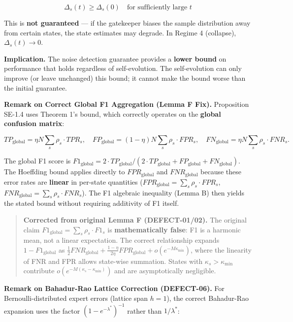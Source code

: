\documentclass[
  12pt,
]{article}
\begin{document}
\[
\Delta_s(t) \geq \Delta_s(0) \quad \text{for sufficiently large } t
\]

This is \textbf{not guaranteed} --- if the gatekeeper biases the sample
distribution away from certain states, the state estimates may degrade.
In Regime 4 (collapse), \(\Delta_s(t) \to 0\).

\textbf{Implication.} The noise detection guarantee provides a
\textbf{lower bound} on performance that holds regardless of
self-evolution. The self-evolution can only improve (or leave unchanged)
this bound; it cannot make the bound worse than the initial guarantee.

\textbf{Remark on Correct Global F1 Aggregation (Lemma F Fix).}
Proposition SE-1.4 uses Theorem 1's bound, which correctly operates on
the \textbf{global confusion matrix}:

\[TP_{\text{global}} = \eta N \sum_s \rho_s \cdot TPR_s,\quad
FP_{\text{global}} = (1-\eta)N \sum_s \rho_s \cdot FPR_s,\quad
FN_{\text{global}} = \eta N \sum_s \rho_s \cdot FNR_s.\]

The global F1 score is
\(F1_{\text{global}} = 2 \cdot TP_{\text{global}} / (2 \cdot TP_{\text{global}} + FP_{\text{global}} + FN_{\text{global}})\).
The Hoeffding bound applies directly to \(FPR_{\text{global}}\) and
\(FNR_{\text{global}}\) because these error rates are \textbf{linear} in
per-state quantities
(\(FPR_{\text{global}} = \sum_s \rho_s \cdot FPR_s\),
\(FNR_{\text{global}} = \sum_s \rho_s \cdot FNR_s\)). The F1 algebraic
inequality (Lemma B) then yields the stated bound without requiring
additivity of F1 itself.

\begin{quote}
\textbf{Corrected from original Lemma F (DEFECT-01/02).} The original
claim \(F1_{\text{global}} = \sum_s \rho_s \cdot F1_s\) is
\textbf{mathematically false}: F1 is a harmonic mean, not a linear
expectation. The correct relationship expands \(1 - F1_{\text{global}}\)
as
\(\frac{1}{2}FNR_{\text{global}} + \frac{1-\eta}{2\eta}FPR_{\text{global}} + o(e^{-M\kappa_{\min}})\),
where the linearity of FNR and FPR allows state-wise summation. States
with \(\kappa_s > \kappa_{\min}\) contribute
\(o(e^{-M(\kappa_s-\kappa_{\min})})\) and are asymptotically negligible.
\end{quote}

\textbf{Remark on Bahadur-Rao Lattice Correction (DEFECT-06).} For
Bernoulli-distributed expert errors (lattice span \(h=1\)), the correct
Bahadur-Rao expansion uses the factor \((1-e^{-\lambda^*})^{-1}\) rather
than \(1/\lambda^*\):
\end{document}
